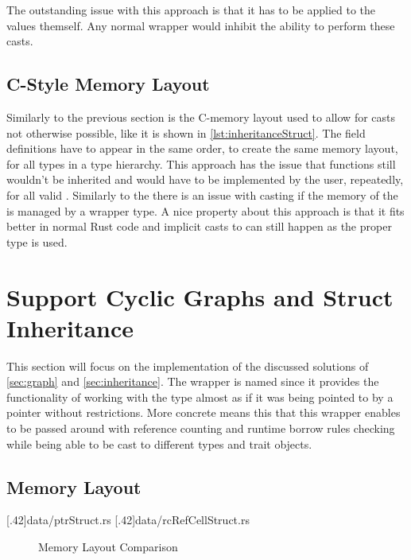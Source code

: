\documentclass[thesis]{subfiles}
\begin{document}
    The outstanding issue with this approach is that it has to be applied to the values themself.
    Any normal wrapper would inhibit the ability to perform these casts.

  \subsection{C-Style Memory Layout}
    Similarly to the previous section is the C-memory layout used to allow for casts not otherwise possible, like it is shown in \autoref{lst:inheritanceStruct}.
    The field definitions have to appear in the same order, to create the same memory layout, for all types in a type hierarchy\autocite[repr(C)]{rust-nom}.
    This approach has the issue that functions still wouldn't be inherited and would have to be implemented by the user, repeatedly, for all valid \structs.
    Similarly to the \traits there is an issue with casting if the memory of the \struct is managed by a wrapper type.
    A nice property about this approach is that it fits better in normal Rust code and implicit casts to  can still happen as the proper type is used.


\section{Support Cyclic Graphs and Struct Inheritance}
  This section will focus on the implementation of the discussed solutions of \autoref{sec:graph} and \autoref{sec:inheritance}.
  The wrapper is named \PtrT since it provides the functionality of working with the type \T almost as if it was being pointed to by a pointer without restrictions.
  More concrete means this that this wrapper enables \T to be passed around with reference counting and runtime borrow rules checking while being able to be cast to different types and trait objects.

  \subsection{Memory Layout}
    \LstTikzBox{\ptrStruct}[.42\linewidth]{data/ptrStruct.rs}
    \LstTikzBox{\rcRefCellStruct}[.42\linewidth]{data/rcRefCellStruct.rs}
    \begin{figure}[ht]
      \captionsetup{type=lstlisting}
      \hfill%
      \caption{Memory Layout Comparison}\label{lst:memoryLayout}
    \end{figure}
\end{document}

